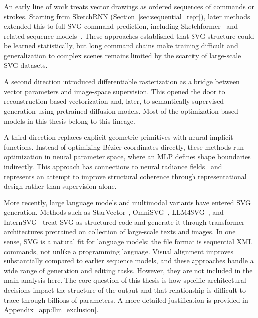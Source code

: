 An early line of work treats vector drawings as ordered 
sequences of commands or strokes. Starting from 
SketchRNN (Section~\ref{sec:sequential_repr}), later 
methods extended this to full SVG command prediction, 
including 
Sketchformer~\cite{ribeiroSketchformerTransformerbasedRepresentation2020} 
and related sequence 
models~\cite{ganinSynthesizingProgramsImages2018, 
lopesLearnedRepresentationScalable2019b}. These approaches 
established that SVG structure could be learned 
statistically, but long command chains make training 
difficult and generalization to complex scenes remains 
limited by the scarcity of large-scale SVG datasets.

A second direction introduced differentiable rasterization as
a bridge between vector parameters and image-space supervision.
This opened the door to reconstruction-based
vectorization and, later, to semantically supervised generation
using pretrained diffusion models. Most of the optimization-based
models in this thesis belong to this lineage.

A third direction replaces explicit geometric primitives with
neural implicit functions. Instead of optimizing Bézier
coordinates directly, these methods run optimization in neural
parameter space, where an MLP defines shape boundaries
indirectly. This approach has connections to neural radiance
fields~\cite{mildenhallNeRFRepresentingScenes2020} and
represents an attempt to improve structural coherence through
representational design rather than supervision alone.

More recently, large language models and multimodal variants
have entered SVG generation. Methods such as
StarVector~\cite{rodriguezStarVectorGeneratingScalable2025},
OmniSVG~\cite{yangOmniSVGUnifiedScalable2025},
LLM4SVG~\cite{xingEmpoweringLLMsUnderstand2025}, and
InternSVG~\cite{wangInternSVGUnifiedSVG2025} treat SVG as
structured code and generate it through transformer
architectures pretrained on collection of large-scale texts and images. 
In one sense, SVG is a natural fit for language
models: the file format is sequential XML commands, not
unlike a programming language. Visual alignment improves
substantially compared to earlier sequence models, and
these approaches handle a wide range of generation and
editing tasks. However, they are not included in the main
analysis here. The core question of this thesis is how
specific architectural decisions impact the structure
of the output and that relationship is difficult to
trace through billions of parameters. A more detailed
justification is provided in Appendix~\ref{app:llm_exclusion}.

